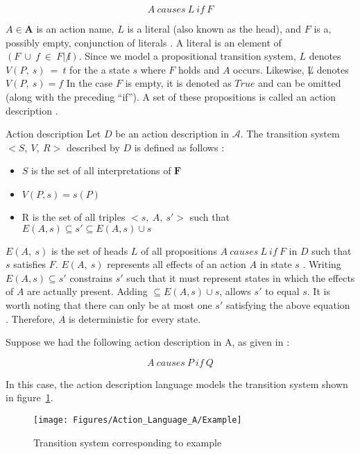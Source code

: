 $$
A\ causes\ L\ if\ F
$$

$ A \in \boldsymbol{A} $ is an action name, $ L $ is a literal (also known as the head), and $ F $ is a, possibly empty, conjunction of literals \cite{gelfond_action_1998}.
A literal is an element of $(F\ \cup\ {f\ \in\ F |\ \not f})$.
Since we model a propositional transition system, $L$ denotes $V(P,\ s)\ =\ t$ for the a state $s$ where $F$ holds and $A$ occurs.
Likewise, $\not L$ denotes $V(P,\ s)=f$
In the case $ F $ is empty, it is denoted as $ True $ and can be omitted (along with the preceding ``if'').
A set of these propositions is called an action description \cite{gelfond_action_1998}.

\begin{definition}{Action description}
    Let $ D $ be an action description in $ \mathcal{A} $.
    The transition system $ <S,\ V,\ R> $ described by $ D $ is defined as follows \cite{gelfond_action_1998}:

    \begin{itemize}
        \item $ S $ is the set of all interpretations of $ \boldsymbol{F} $
        \item $ V(P, s) = s(P) $
        \item R is the set of all triples $ <s,\ A,\ s'> $ such that $ E(A,s) \subseteq s' \subseteq E(A,s) \cup s $
    \end{itemize}
\end{definition}

$ E(A,\ s) $ is the set of heads $ L $ of all propositions $ A\ causes\ L\ if\ F $ in $ D $ such that $ s $ satisfies $ F $.
$ E(A,\ s) $ represents all effects of an action $ A $ in state $ s $ \cite{gelfond_action_1998}.
Writing $ E\left(A,s\right)\subseteq s' $ constrains $ s' $ such that it must represent states in which the effects of $ A $ are actually present.
Adding $ \subseteq E\left(A,s\right)\cup s $, allows $ s' $ to equal $ s $.
It is worth noting that there can only be at most one $ s' $ satisfying the above equation \cite{gelfond_action_1998}.
Therefore, $ A $ is deterministic for every state.

Suppose we had the following action description in A, as given in \cite{gelfond_action_1998}:

$$
A\ causes\ P\ if\ Q
$$

In this case, the action description language models the transition system shown in figure~\ref{fig:action_language_a_example}.

\begin{figure}
    \centering
    \texttt{[image: Figures/Action\_Language\_A/Example]}
    \caption{Transition system corresponding to example}
    \label{fig:action_language_a_example}
\end{figure}

